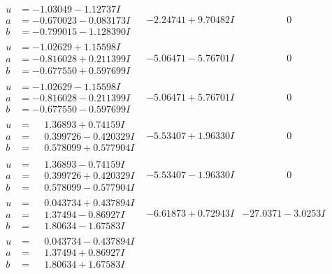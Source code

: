 \documentclass[1p]{elsarticle_modified}
\theoremstyle{definition}
\begin{document}
$$\begin{array}{c|c|c}
 \hline 
\begin{aligned}
u &= -1.03049 - 1.12737 I \\
a &= -0.670023 - 0.083173 I \\
b &= -0.799015 - 1.128390 I\end{aligned}
 & -2.24741 + 9.70482 I & \phantom{-0.000000 } 0 \\ \hline\begin{aligned}
u &= -1.02629 + 1.15598 I \\
a &= -0.816028 + 0.211399 I \\
b &= -0.677550 + 0.597699 I\end{aligned}
 & -5.06471 - 5.76701 I & \phantom{-0.000000 } 0 \\ \hline\begin{aligned}
u &= -1.02629 - 1.15598 I \\
a &= -0.816028 - 0.211399 I \\
b &= -0.677550 - 0.597699 I\end{aligned}
 & -5.06471 + 5.76701 I & \phantom{-0.000000 } 0 \\ \hline\begin{aligned}
u &= \phantom{-}1.36893 + 0.74159 I \\
a &= \phantom{-}0.399726 - 0.420329 I \\
b &= \phantom{-}0.578099 + 0.577904 I\end{aligned}
 & -5.53407 + 1.96330 I & \phantom{-0.000000 } 0 \\ \hline\begin{aligned}
u &= \phantom{-}1.36893 - 0.74159 I \\
a &= \phantom{-}0.399726 + 0.420329 I \\
b &= \phantom{-}0.578099 - 0.577904 I\end{aligned}
 & -5.53407 - 1.96330 I & \phantom{-0.000000 } 0 \\ \hline\begin{aligned}
u &= \phantom{-}0.043734 + 0.437894 I \\
a &= \phantom{-}1.37494 - 0.86927 I \\
b &= \phantom{-}1.80634 - 1.67583 I\end{aligned}
 & -6.61873 + 0.72943 I & -27.0371 - 3.0253 I \\ \hline\begin{aligned}
u &= \phantom{-}0.043734 - 0.437894 I \\
a &= \phantom{-}1.37494 + 0.86927 I \\
b &= \phantom{-}1.80634 + 1.67583 I\end{aligned}

\end{array}$$
\end{document}
